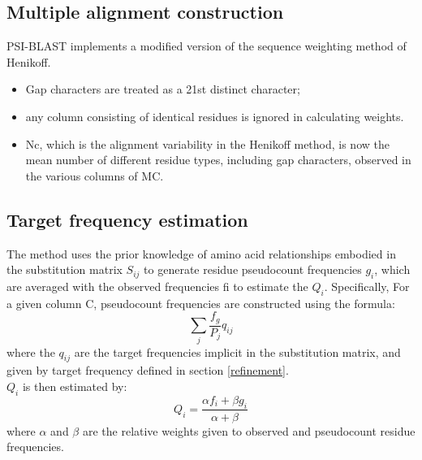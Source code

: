         \subsection{Multiple alignment construction}
        PSI-BLAST implements a modified version of the sequence weighting method of Henikoff. 
        \begin{itemize}
            \item Gap characters are treated as a 21st distinct character;
            \item any column consisting of identical residues is ignored in calculating weights.
            \item N{c}, which is the alignment variability in the Henikoff method, is now the mean number of different residue types, including gap characters, observed in the various columns of M{C}.
        \end{itemize} 

    \subsection{Target frequency estimation}
    The method uses the prior knowledge of amino acid relationships embodied in the substitution matrix $S_{ij}$ to generate residue pseudocount frequencies $g_i$, which are averaged with the observed frequencies f{i} to estimate the $Q_i$.
    Specifically,
    For a given column C, pseudocount frequencies are constructed using the formula:
    $$ \sum_{j} \frac{f_g}{P_j} q_{ij} $$
    where the $q_{ij}$ are the target frequencies implicit in the substitution matrix, and given by target frequency defined in section \ref{refinement}. \\
    $Q_i$ is then estimated by:
    $$ Q_i = \frac{\alpha f_i + \beta g_i }{\alpha + \beta}$$ where $\alpha$ and $\beta$ are the relative weights given to observed and
    pseudocount residue frequencies.

